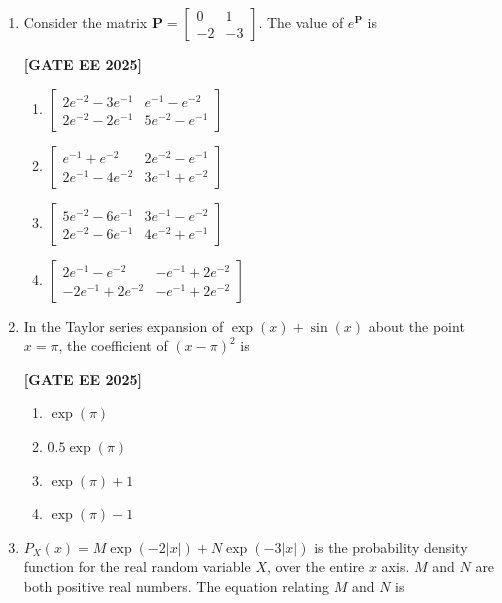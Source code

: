 \documentclass[12pt]{article}
\begin{document}
\begin{enumerate}[leftmargin=*, label=\textbf{Q.\arabic*:}]
\item Consider the matrix $\mathbf{P} = \begin{bmatrix} 0 & 1 \\ -2 & -3 \end{bmatrix}$. The value of $e^{\mathbf{P}}$ is
 
\noindent \textbf{[GATE EE 2025]}
\begin{enumerate}[label=(\Alph*)]
    \item $\begin{bmatrix} 2e^{-2} - 3e^{-1} & e^{-1} - e^{-2} \\ 2e^{-2} - 2e^{-1} & 5e^{-2} - e^{-1}\end{bmatrix}$
    \item $\begin{bmatrix} e^{-1} + e^{-2} & 2e^{-2} - e^{-1} \\ 2e^{-1} - 4e^{-2} & 3e^{-1} + e^{-2} \end{bmatrix}$
    \item $\begin{bmatrix} 5e^{-2} - 6e^{-1} & 3e^{-1} - e^{-2} \\ 2e^{-2} - 6e^{-1} & 4e^{-2} + e^{-1} \end{bmatrix}$
    \item $\begin{bmatrix} 2e^{-1} - e^{-2} & -e^{-1} + 2e^{-2} \\ -2e^{-1} + 2e^{-2} & -e^{-1} + 2e^{-2} \end{bmatrix}$
\end{enumerate}

\item In the Taylor series expansion of $\exp(x) + \sin(x)$ about the point $x = \pi$, the coefficient of $(x - \pi)^2$ is
 
\noindent \textbf{[GATE EE 2025]}
\begin{enumerate}[label=(\Alph*)]
    \item $\exp(\pi)$
    \item $0.5 \exp(\pi)$
    \item $\exp(\pi) + 1$
    \item $\exp(\pi) - 1$
\end{enumerate}

\item $P_X(x) = M\exp(-2|x|) + N\exp(-3|x|)$ is the probability density function for the real random variable $X$, over the entire $x$ axis. $M$ and $N$ are both positive real numbers. The equation relating $M$ and $N$ is
 

\end{enumerate}
\end{document}
